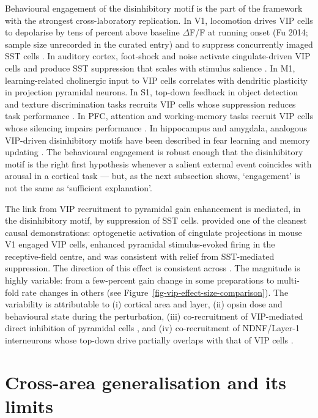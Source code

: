 \documentclass[11pt]{article}
\begin{document}
Behavioural engagement of the disinhibitory motif is the part of the framework with the strongest cross-laboratory replication. In V1, locomotion drives VIP cells to depolarise by tens of percent above baseline $\Delta$F/F at running onset (Fu 2014; sample size unrecorded in the curated entry) and to suppress concurrently imaged SST cells \citep{Fu2014, Garciadelmolino2017, Dipoppa2018}. In auditory cortex, foot-shock and noise activate cingulate-driven VIP cells and produce SST suppression that scales with stimulus salience \citep{Pi2013}. In M1, learning-related cholinergic input to VIP cells correlates with dendritic plasticity in projection pyramidal neurons. In S1, top-down feedback in object detection and texture discrimination tasks recruits VIP cells whose suppression reduces task performance \citep{Sermet2019}. In PFC, attention and working-memory tasks recruit VIP cells whose silencing impairs performance \citep{Kamigaki2017}. In hippocampus and amygdala, analogous VIP-driven disinhibitory motifs have been described in fear learning and memory updating \citep{Krabbe2019, Turi2019, Tamboli2024}. The behavioural engagement is robust enough that the disinhibitory motif is the right first hypothesis whenever a salient external event coincides with arousal in a cortical task --- but, as the next subsection shows, `engagement' is not the same as `sufficient explanation'.

The link from VIP recruitment to pyramidal gain enhancement is mediated, in the disinhibitory motif, by suppression of SST cells. \citet{Zhang2014} provided one of the cleanest causal demonstrations: optogenetic activation of cingulate projections in mouse V1 engaged VIP cells, enhanced pyramidal stimulus-evoked firing in the receptive-field centre, and was consistent with relief from SST-mediated suppression. The direction of this effect is consistent across \citep{Lee2013, Fu2014, Karnani2016a, Pinto2015, Veit2023}. The magnitude is highly variable: from a few-percent gain change in some preparations to multi-fold rate changes in others (see Figure~\ref{fig-vip-effect-size-comparison}). The variability is attributable to (i) cortical area and layer, (ii) opsin dose and behavioural state during the perturbation, (iii) co-recruitment of VIP-mediated direct inhibition of pyramidal cells \citep{Karnani2016b, Lee2013, Pi2013}, and (iv) co-recruitment of NDNF/Layer-1 interneurons whose top-down drive partially overlaps with that of VIP cells \citep{Abs2018, Anastasiades2021a, Veit2023}.

\section{Cross-area generalisation and its limits}
\end{document}
